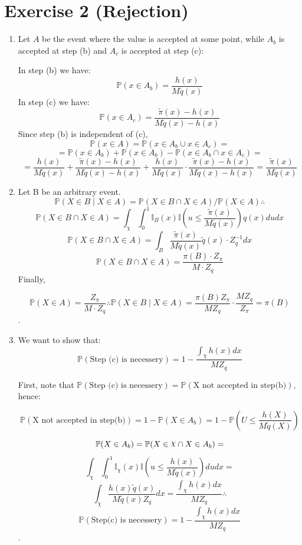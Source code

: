 \documentclass[12pt,letterpaper]{article}
\DeclareRobustCommand{\rchi}{{\mathpalette\irchi\relax}}
\newcommand{\irchi}[2]{\raisebox{\depth}{$#1\chi$}}
\begin{document}
\section*{Exercise 2 (Rejection)}
\begin{enumerate}[leftmargin=!,labelindent=5pt]

	\item Let $A$ be the event where the value is accepted at some point,
	while $A_b$ is accepted at step (b) and $A_c$ is accepted at step (c):

	In step (b) we have:
	$$\mathbb{P}(x \in A_b)
	= \frac{h(x)}{M\tilde{q}(x)}$$
	In step (c) we have:
	$$\mathbb{P}(x \in A_c)
	= \frac{\tilde{\pi}(x) - h(x)}{M\tilde{q}(x) - h(x)}$$
	Since step (b) is independent of (c),
	$$\mathbb{P}(x \in A) = \mathbb{P}(x \in A_b \cup x \in A_c) =$$
	$$= \mathbb{P}(x\in A_b)+\mathbb{P}(x\in A_b)-
	\mathbb{P}(x \in A_b \cap x \in A_c) = $$
	$$ = \frac{h(x)}{M\tilde{q}(x)} +
	\frac{\tilde{\pi}(x) - h(x)}{M\tilde{q}(x) - h(x)} + 
	\frac{h(x)}{M\tilde{q}(x)}\cdot
	\frac{\tilde{\pi}(x) - h(x)}{M\tilde{q}(x) - h(x)} =
	\frac{\tilde{\pi}(x)}{M\tilde{q}(x)}
	$$

	\item Let B be an arbitrary event.
	$$\mathbb{P}(X \in B \mid X \in A) =
	\mathbb{P}(X \in B \cap X \in A) / \mathbb{P}(X \in A) \therefore$$
	$$ \mathbb{P}(X \in B \cap X \in A) =
	\int_{\chi}\int_{0}^{1}
	\mathbb{I}_B(x)\mathbb{I}
	\left( u \leq \frac{\tilde{\pi}(x)}{M\tilde{q}(x)} \right) q(x) du dx$$
	$$ \mathbb{P}(X \in B \cap X \in A) =
	\int_{B}
	\frac{\tilde{\pi}(x)}{M\tilde{q}(x)}\tilde{q}(x)\cdot Z_q^{-1} dx$$
	$$ \mathbb{P}(X \in B \cap X \in A) =
	\frac{\pi(B)\cdot Z_\pi}{M \cdot Z_q}
	$$
	Finally,

	$$\mathbb{P}(X \in A) = \frac{Z_\pi}{M\cdot Z_q} \therefore 
	\mathbb{P}(X \in B \mid X \in A) =
	\frac{\pi(B) Z_\pi}{M Z_q}\cdot \frac{M Z_q}{Z_\pi} = \pi(B)$$.

	\item We want to show that:
	$$\mathbb{P}(\text{Step (c) is necessery}) = 1 - \frac{\int_{\chi}h(x)dx}{MZ_q}$$

	First, note that
	$\mathbb{P}(\text{Step (c) is necessery}) =
	\mathbb{P}(\text{X not accepted in step(b)})$, hence:

	$$\mathbb{P}(\text{X not accepted in step(b)}) = 
	1 - \mathbb{P}(X \in A_b) =
	1 - \mathbb{P}\left(U \leq \frac{h(X)}{M\tilde{q}(X)} \right)$$

	$$\mathbb{P}(X \in A_b) = \mathbb{P}(X \in \rchi \cap X \in A_b)=$$
	$$ \int_{\chi}\int_{0}^{1}
	\mathbb{I}_\chi(x)\mathbb{I}
	\left( u \leq \frac{h(x)}{M\tilde{q}(x)} \right) du dx = $$
	$$\int_{\chi}\frac{h(x)\tilde{q}(x)}{M\tilde{q}(x)Z_q}dx = 
	\frac{\int_{\chi}h(x)dx}{MZ_q} \therefore $$
	$$\mathbb{P}(\text{Step(c) is necessery}) = 1
	 - \frac{\int_{\chi}h(x)dx}{MZ_q}$$.


\end{enumerate}
\end{document}
